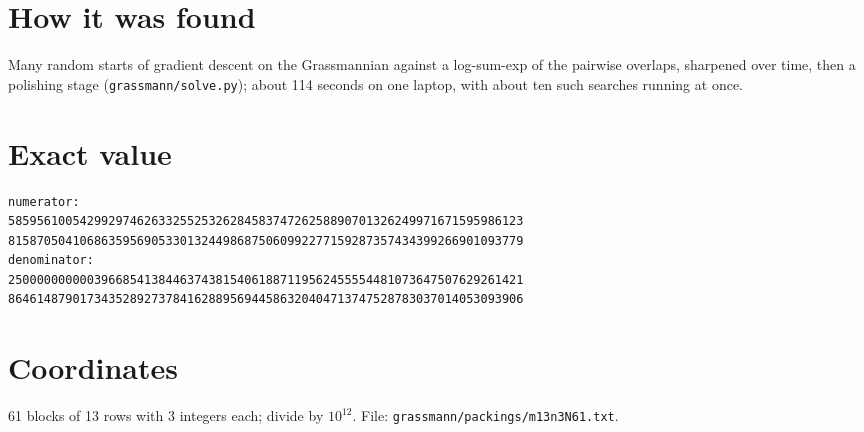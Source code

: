 \documentclass[11pt,a4paper]{article}
\begin{document}
\section{How it was found}
Many random starts of gradient descent on the Grassmannian against a log-sum-exp of the pairwise overlaps, sharpened over time, then a polishing stage (\texttt{grassmann/solve.py}); about 114 seconds on one laptop, with about ten such searches running at once.


\appendix
\section{Exact value}
{\small
\begin{verbatim}
numerator:
585956100542992974626332552532628458374726258890701326249971671595986123
815870504106863595690533013244986875060992277159287357434399266901093779
denominator:
250000000000396685413844637438154061887119562455554481073647507629261421
864614879017343528927378416288956944586320404713747528783037014053093906
\end{verbatim}}

\section{Coordinates}
61 blocks of 13 rows with 3 integers each; divide by $10^{12}$. File: \texttt{grassmann/packings/m13n3N61.txt}.
{\tiny
\begin{multicols}{3}
\end{multicols}}
\end{document}

